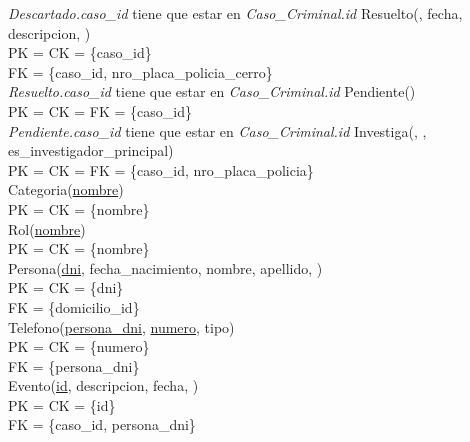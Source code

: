 \documentclass[10pt,a4paper]{article}
\begin{document}
\textit{Descartado.caso\_id} tiene que estar en \textit{Caso\_Criminal.id}
\newline
\newline
Resuelto(, fecha, descripcion, )\\ 
	PK = CK = \{caso\_id\}\\ 
	FK = \{caso\_id, nro\_placa\_policia\_cerro\}\\ 	
\newline
\textit{Resuelto.caso\_id} tiene que estar en \textit{Caso\_Criminal.id}
\newline
\newline
Pendiente()\\ 
  PK = CK = FK = \{caso\_id\}\\ 
\newline
\textit{Pendiente.caso\_id} tiene que estar en \textit{Caso\_Criminal.id}
\newline
\newline
Investiga(, , es\_investigador\_principal)\\ 
  PK = CK = FK = \{caso\_id, nro\_placa\_policia\}\\ 
\newline
\newline
Categoria(\underline{nombre})\\ 
	PK = CK = \{nombre\}\\ 
\newline
Rol(\underline{nombre})\\ 
	PK = CK = \{nombre\}\\ 
\newline
Persona(\underline{dni}, fecha\_nacimiento, nombre, apellido, )\\ 
	PK = CK = \{dni\}\\ 
	FK = \{domicilio\_id\}\\ 
\newline
Telefono(\underline{\underline{persona\_dni}}, \underline{numero}, tipo)\\ 
	PK = CK = \{numero\}\\
	FK = \{persona\_dni\}\\ 
\newline
Evento(\underline{id}, descripcion, fecha, )\\ 
	PK = CK  = \{id\}\\ 
	FK = \{caso\_id, persona\_dni\}\\
\end{document}
